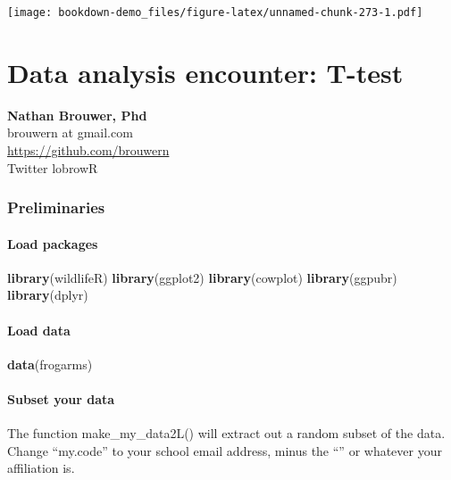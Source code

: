 \documentclass[]{book}
\newenvironment{Shaded}{\begin{snugshade}}{\end{snugshade}}
\newcommand{\KeywordTok}[1]{\textcolor[rgb]{0.13,0.29,0.53}{\textbf{#1}}}
\newcommand{\NormalTok}[1]{#1}
\theoremstyle{definition}
\theoremstyle{definition}
\theoremstyle{definition}
\theoremstyle{remark}
\begin{document}
\texttt{[image: bookdown-demo\_files/figure-latex/unnamed-chunk-273-1.pdf]}

\chapter{Data analysis encounter:
T-test}\label{data-analysis-encounter-t-test}

\textbf{Nathan Brouwer, Phd}\\
brouwern at gmail.com\\
\url{https://github.com/brouwern}\\
Twitter lobrowR

\subsection{Preliminaries}\label{preliminaries-4}

\subsubsection{Load packages}\label{load-packages-3}

\begin{Shaded}
\begin{Highlighting}[]
\KeywordTok{library}\NormalTok{(wildlifeR)}
\KeywordTok{library}\NormalTok{(ggplot2)}
\KeywordTok{library}\NormalTok{(cowplot)}
\KeywordTok{library}\NormalTok{(ggpubr)}
\KeywordTok{library}\NormalTok{(dplyr)}
\end{Highlighting}
\end{Shaded}

\subsubsection{Load data}\label{load-data-3}

\begin{Shaded}
\begin{Highlighting}[]
\KeywordTok{data}\NormalTok{(frogarms)}
\end{Highlighting}
\end{Shaded}

\subsubsection{Subset your data}\label{subset-your-data-3}

The function make\_my\_data2L() will extract out a random subset of the
data. Change ``my.code'' to your school email address, minus the
``\citet{pitt.edu}'' or whatever your affiliation is.
\end{document}
